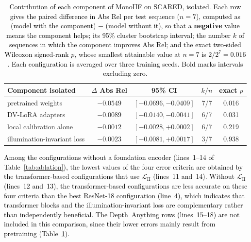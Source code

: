 \documentclass[a4paper,fleqn]{cas-dc}
\begin{document}
%
\begin{table}[t]
\centering
\caption{\textcolor{black}{Contribution of each component of MonoIIF on SCARED, isolated. Each row gives the paired difference in Abs Rel per test sequence ($n=7$), computed as (model with the component) $-$ (model without it), so that a \textbf{negative} value means the component helps; its 95\% cluster bootstrap interval; the number $k$ of sequences in which the component improves Abs Rel; and the exact two-sided Wilcoxon signed-rank $p$, whose smallest attainable value at $n=7$ is $2/2^{7}=0.016$. Each configuration is averaged over three training seeds. Bold marks intervals excluding zero.}}
\label{tab:components-isolated-scared}
\small
\begin{tabular}{lcccc}
\toprule
Component isolated & $\Delta$ Abs Rel & 95\% CI & $k/n$ & exact $p$ \\
\midrule
pretrained weights & $\mathbf{-0.0549}$ & $[-0.0696, -0.0409]$ & 7/7 & 0.016 \\
DV-LoRA adapters & $\mathbf{-0.0089}$ & $[-0.0140, -0.0041]$ & 6/7 & 0.031 \\
local calibration alone & $-0.0012$ & $[-0.0028, +0.0002]$ & 6/7 & 0.219 \\
illumination-invariant loss & $-0.0023$ & $[-0.0081, +0.0017]$ & 3/7 & 0.938 \\
\bottomrule
\end{tabular}
\end{table}
%
\textcolor{black}
{ Among the configurations without a foundation encoder (lines~1--14 of Table~\ref{tab:ablation}), the lowest values of the four error criteria are obtained by the transformer-based configurations that use $\mathcal{L}_\textrm{II}$ (lines~11 and~14). Without $\mathcal{L}_\textrm{II}$ (lines~12 and~13), the transformer-based configurations are less accurate on these four criteria than the best ResNet-18 configuration (line~4), which indicates that transformer blocks and the illumination-invariant loss are complementary rather than independently beneficial. The Depth~Anything rows (lines~15--18) are not included in this comparison, since their lower errors mainly result from pretraining (Table~\ref{tab:components-isolated-scared}).} \vspace*{1mm} \\
\end{document}
